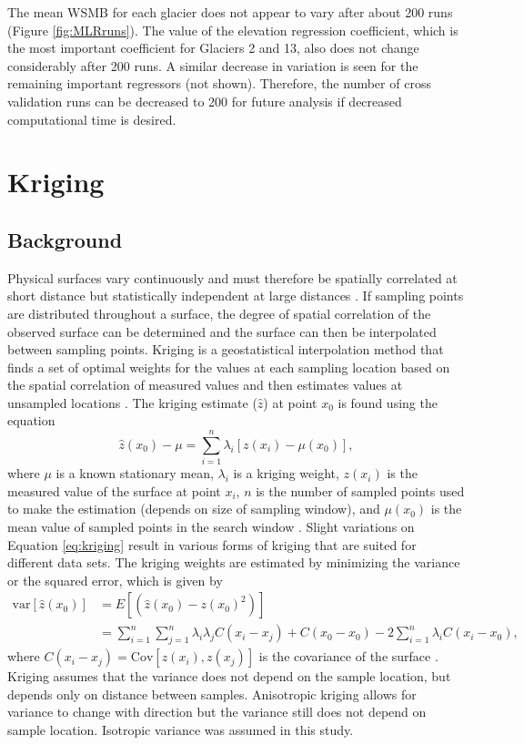 \documentclass{sfuthesis}
\begin{document}
The mean WSMB for each glacier does not appear to vary after about 200 runs (Figure \ref{fig:MLRruns}). The value of the elevation regression coefficient, which is the most important coefficient for Glaciers 2 and 13, also does not change considerably after 200 runs. A similar decrease in variation is seen for the remaining important regressors (not shown). Therefore, the number of cross validation runs can be decreased to 200 for future analysis if decreased computational time is desired. 

\section{Kriging}
\label{sec:kriging}

\subsection{Background}

Physical surfaces vary continuously and must therefore be spatially correlated at short distance but statistically independent at large distances \citep{Davis1986}. If sampling points are distributed throughout a surface, the degree of spatial correlation of the observed surface can be determined and the surface can then be interpolated between sampling points. Kriging is a geostatistical interpolation method that finds a set of optimal weights for the values at each sampling location based on the spatial correlation of measured values and then estimates values at unsampled locations \citep{Davis1986, Li2014}. The kriging estimate ($\hat{z}$) at point $x_0$ is found using the equation
\begin{equation}
\label{eq:kriging}
\hat{z}(x_0) - \mu = \sum_{i=1}^{n} \lambda_i [z(x_i)-\mu(x_0)],
\end{equation}
where $\mu$ is a known stationary mean, $\lambda_i$ is a kriging weight, $z(x_i)$ is the measured value of the surface at point $x_i$, $n$ is the number of sampled points used to make the estimation (depends on size of sampling window), and $\mu(x_0)$ is the mean value of sampled points in the search window \citep{Wackernagel2003, Li2008}. Slight variations on Equation \ref{eq:kriging} result in various forms of kriging that are suited for different data sets. The kriging weights are estimated by minimizing the variance or the squared error, which is given by
\begin{align}
\mathrm{var}[\hat{z}(x_0)] &= E[(\hat{z}(x_0)-z(x_0)^2)]\\
&=\sum_{i=1}^{n}\sum_{j=1}^{n}\lambda_i \lambda_j C(x_i-x_j)+C(x_0-x_0)-2 \sum_{i=1}^{n} \lambda_i C(x_i-x_0),
\end{align}
where $C(x_i-x_j) = \mathrm{Cov}[z(x_i),z(x_j)]$ is the covariance of the surface \citep{Li2008}. Kriging assumes that the variance does not depend on the sample location, but depends only on distance between samples.  Anisotropic kriging allows for variance to change with direction but the variance still does not depend on sample location. Isotropic variance was assumed in this study.
\end{document}

